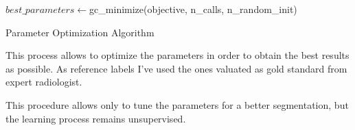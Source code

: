 \documentclass{standalone}
\begin{document}
	
	\begin{algorithm}[h!]
	
		\SetAlgoLined
		\DontPrintSemicolon
		
		
			
		
		
		$best\_parameters\leftarrow$gc\_minimize(objective, n\_calls, n\_random\_init)\;
		
			\caption{Parameter Optimization Algorithm}\label{alg:optimize}
	\end{algorithm}
		
		
	This process allows to optimize the parameters in order to obtain the best results as possible. As reference labels I've used the ones valuated as gold standard from expert radiologist.
	
	This procedure allows only to tune the parameters for a better segmentation, but the learning process remains unsupervised.
\end{document}
